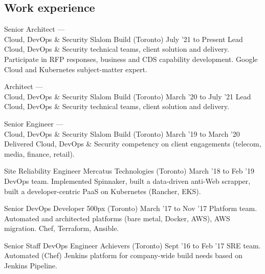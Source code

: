 \documentclass[]{cvpn}
\begin{document}
\cvheader{}

     {\def\gitrev{\unskip}}
     {\def\gitrev{unknown}}
\cvtag{\gitrev}

\begin{multicols}{2}
\section{Work experience}
\begin{eventlist}

\item{Senior Architect ---\\Cloud, DevOps \& Security}
{Slalom Build (Toronto)}
{July '21 to Present}
{
     Lead Cloud, DevOps \& Security
     technical teams, client solution and delivery.
     Participate in RFP responses, business and CDS capability
     development. Google Cloud and Kubernetes subject-matter
     expert.
}

\eventlink{}

\item{Architect ---\\Cloud, DevOps \& Security}
     {Slalom Build (Toronto)}
     {March '20 to July '21}
{
     Lead Cloud, DevOps \& Security
     technical teams, client solution and delivery.
}

\eventlink{}

\item{Senior Engineer ---\\Cloud, DevOps \& Security}
     {Slalom Build (Toronto)}
     {March '19 to March '20}
{
     Delivered Cloud, DevOps \& Security competency
     on client engagements (telecom, media, finance, retail).
}

\item{Site Reliability Engineer}
     {Mercatus Technologies (Toronto)}
     {March '18 to Feb '19}
{
DevOps team.
Implemented Spinnaker,
built a data-driven anti-Web scrapper,
built a developer-centric PaaS on Kubernetes
(Rancher, EKS).
}

\item{Senior DevOps Developer}
     {500px (Toronto)}
     {March '17 to Nov '17}
{
Platform team.
Automated and architected platforms
(bare metal, Docker, AWS),
AWS migration. Chef, Terraform, Ansible.
}

\item{Senior Staff DevOps Engineer}
     {Achievers (Toronto)}
     {Sept '16 to Feb '17}
{
SRE team.
Automated (Chef) Jenkins platform for company-wide build
needs based on Jenkins Pipeline.
}


\end{eventlist}
\end{multicols}
\end{document}

